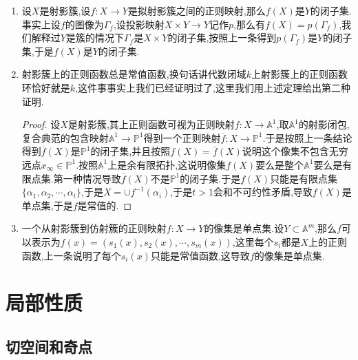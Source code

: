 \begin{enumerate}
\begin{proof}
    	\qquad
    	
    	如果把向量组$\{g_i(u;y_0)N_i^{\beta}\}$表示为基$\{M^{\alpha}\}_{\alpha}$下的矩阵,那么使得$I_s\subseteq I$的点集$y_0$恰好是这个矩阵存在某个$\dim I_s$阶子式不为零的点构成的集合.于是使得$I$不包含$I_s$的点$y_0$构成的集合恰好是使得这个矩阵所有$\dim I_s$阶子式为零的点构成的集合,于是$T_s$被一组$u$系数多项式定义,于是$T_s$是$\mathbb{A}^m$的闭子集,完成证明.
    \end{proof}
    \item 设$X$是射影簇,设$f:X\to Y$是拟射影簇之间的正则映射,那么$f(X)$是$Y$的闭子集.事实上设$f$的图像为$\Gamma_f$,设投影映射$X\times Y\to Y$记作$p$,那么有$f(X)=p(\Gamma_f)$,我们解释过$Y$是簇的情况下$\Gamma_f$是$X\times Y$的闭子集,按照上一条得到$p(\Gamma_f)$是$Y$的闭子集,于是$f(X)$是$Y$的闭子集.
    \item 射影簇上的正则函数总是常值函数,换句话讲代数闭域$k$上射影簇上的正则函数环恰好就是$k$,这件事事实上我们已经证明过了,这里我们用上述定理给出第二种证明.
    \begin{proof}
    	
    	设$X$是射影簇,其上正则函数可视为正则映射$f:X\to\mathbb{A}^1$,取$\mathbb{A}^1$的射影闭包,复合典范的包含映射$\mathbb{A}^1\to\mathbb{P}^1$得到一个正则映射$\overline{f}:X\to\mathbb{P}^1$.于是按照上一条结论得到$\overline{f}(X)$是$\mathbb{P}^1$的闭子集,并且按照$f(X)=\overline{f}(X)$说明这个像集不包含无穷远点$x_{\infty}\in\mathbb{P}^1$.按照$\mathbb{A}^1$上是余有限拓扑,这说明像集$f(X)$要么是整个$\mathbb{A}^1$要么是有限点集.第一种情况导致$\overline{f}(X)$不是$\mathbb{P}^1$的闭子集.于是$f(X)$只能是有限点集$\{\alpha_1,\alpha_2,\cdots,\alpha_t\}$,于是$X=\cup f^{-1}(\alpha_i)$,于是$t>1$会和不可约性矛盾,导致$f(X)$是单点集,于是$f$是常值的.
    \end{proof}
    \item 一个从射影簇到仿射簇的正则映射$f:X\to Y$的像集是单点集.设$Y\subset\mathbb{A}^m$,那么$f$可以表示为$f(x)=(s_1(x),s_2(x),\cdots,s_m(x))$,这里每个$s_i$都是$X$上的正则函数,上一条说明了每个$s_i(x)$只能是常值函数,这导致$f$的像集是单点集.
\end{enumerate}
\newpage
\section{局部性质}
\subsection{切空间和奇点}

